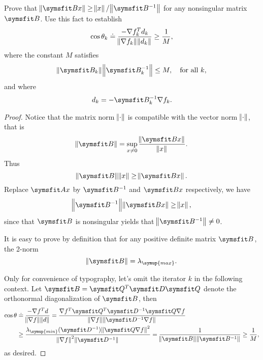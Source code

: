 \documentclass{assignment}[2019/09/15]
\newcommand{\dfd}{\nabla f_k^Td_k}
\newcommand{\nbi}{\norm{\matr{B}^{-1}}}
\newcommand{\nbki}{\norm{\matr{B}_k^{-1}}}
\newcommand{\nbk}{\norm{\matr{B}_k}}
\newcommand{\df}{\nabla f}
\begin{document}
    \begin{problem}
        Prove that $\norm{\matr{B}x}\geq\norm{x}/\nbi$ for any nonsingular matrix $\matr{B}$. Use this fact to establish
        \begin{equation}
            \cos{\theta_k}\doteq\frac{-\dfd}{\norm{\nabla f_k}\norm{d_k}}\geq\frac{1}{M},
        \end{equation}
        where the constant $M$ satisfies
        \begin{equation}
            \nbk\nbki\leq M,\quad \text{for all } k,
        \end{equation}
        and where
        \begin{equation}
            d_k=-\matr{B}_k^{-1}\nabla f_k.
        \end{equation}
    \end{problem}
    \begin{proof}
        Notice that the matrix norm $\norm{\cdot}$ is compatible with the vector norm $\norm{\cdot}$, that is
        \begin{equation}
            \norm{\matr{B}}=\sup_{x\neq 0}\frac{\norm{\matr{B}x}}{\norm{x}}.
        \end{equation}
        Thus
        \begin{equation}
            \norm{\matr{B}}\norm{x}\geq\norm{\matr{B}x}.
        \end{equation}
        Replace $\matr{A}x$ by $\matr{B}^{-1}$ and $\matr{B}x$ respectively, we have
        \begin{equation}
            \norm{\matr{B}^{-1}}\norm{\matr{B}x}\geq\norm{x},
        \end{equation}
        since that $\matr{B}$ is nonsingular yields that $\norm{\matr{B}^{-1}}\neq 0$.

        It is easy to prove by definition that for any positive definite matrix $\matr{B}$, the 2-norm
        \begin{equation}
            \norm{\matr{B}}=\lambda_{\symup{max}}.
        \end{equation}

        Only for convenience of typography, let's omit the iterator $k$ in the following context. Let $\matr{B}=\matr{Q}^T\matr{D}\matr{Q}$
        denote the orthonormal diagonalization of $\matr{B}$,
        then
        \begin{equation}
            \begin{aligned}
                \cos{\theta}
                &\doteq\frac{-\nabla f^Td}{\norm{\nabla f}\norm{d}}
                =\frac{\df^T\matr{Q}^T\matr{D}^{-1}\matr{Q}\df}{\norm{\df}\norm{\matr{D}^{-1}\df}}\\
                &\geq\frac{\lambda_{\symup{min}}(\matr{D}^{-1})\norm{\matr{Q}\df}^2}{\norm{\df}^2\norm{\matr{D}^{-1}}}
                =\frac{1}{\norm{\matr{B}}\norm{\matr{B}^{-1}}}
                \geq\frac{1}{M},
            \end{aligned}
        \end{equation}
        as desired.
    \end{proof}
\end{document}
